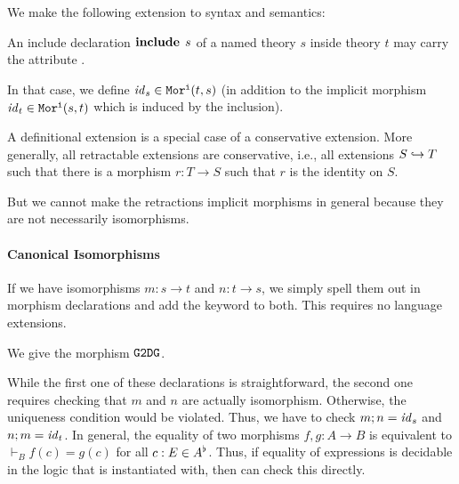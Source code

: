 We make the following extension to syntax and semantics:
\begin{compactitem}
  \item An include declaration $\operatorname{\mathbf{include}}{\;s}$ of a named theory $s$ inside theory $t$ may carry the attribute .
  \item In that case, we define $\mathit{id}_{s}\in\mathtt{Mor^i}(t,s)$ (in addition to the implicit morphism $\mathit{id}_{t}\in\mathtt{Mor^i}(s,t)$ which is induced by the inclusion).
\end{compactitem}


\begin{remark}
A definitional extension is a special case of a conservative extension.
More generally, all retractable extensions are conservative, i.e., all extensions $S\hookrightarrow T$ such that there is a morphism $r:T\to S$ such that $r$ is the identity on $S$.

But we cannot make the retractions implicit morphisms in general because they are not necessarily isomorphisms.
\end{remark}

\paragraph{Canonical Isomorphisms}
If we have isomorphisms $m:s\to t$ and $n:t\to s$, we simply spell them out in morphism declarations and add the keyword  to both.
This requires no language extensions.

\begin{example}\label{group:iso}
We give the morphism $\operatorname{\mathtt{G2DG}}$.

\end{example}

While the first one of these declarations is straightforward, the second one requires checking that $m$ and $n$ are actually isomorphism.
Otherwise, the uniqueness condition would be violated.
Thus, we have to check $m;n=\mathit{id}_{s}$ and $n;m=\mathit{id}_{t}$.
In general, the equality of two morphisms $f,g:A\to B$ is equivalent to $\vdash_B f(c)=g(c)$ for all $c:E\in A^\flat$.
Thus, if equality of expressions is decidable in the logic that \mmt is instantiated with, then \mmt can check this directly.

